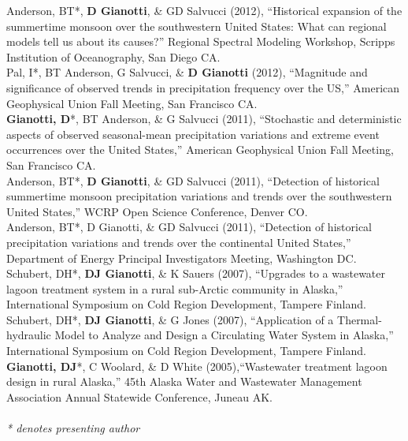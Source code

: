 \documentclass[10pt, a4paper]{article}
\newcommand{\years}[1]{\marginnote{\scriptsize #1}}
\begin{document}
\years{2012}Anderson, BT*, \textbf{D Gianotti}, \& GD Salvucci (2012), ``Historical expansion of the summertime monsoon over the southwestern United States: What can regional models tell us about its causes?'' Regional Spectral Modeling Workshop, Scripps Institution of Oceanography, San Diego CA.\\
\years{2012}Pal, I*, BT Anderson, G Salvucci, \& \textbf{D Gianotti} (2012), ``Magnitude and significance of observed trends in precipitation frequency over the US,'' American Geophysical Union Fall Meeting, San Francisco CA.\\
\years{2011}\textbf{Gianotti, D}*, BT Anderson, \& G Salvucci (2011), ``Stochastic and deterministic aspects of observed seasonal-mean precipitation variations and extreme event occurrences over the United States,'' American Geophysical Union Fall Meeting, San Francisco CA.\\
\years{2011} Anderson, BT*, \textbf{D Gianotti}, \& GD Salvucci (2011), ``Detection of historical summertime monsoon precipitation variations and trends over the southwestern United States,'' WCRP Open Science Conference, Denver CO.\\
\years{2011} Anderson, BT*, D Gianotti, \& GD Salvucci (2011), ``Detection of historical precipitation variations and trends over the continental United States,'' Department of Energy Principal Investigators Meeting, Washington DC.\\
\years{2007}Schubert, DH*, \textbf{DJ Gianotti}, \& K Sauers (2007), ``Upgrades to a  wastewater lagoon treatment system in a rural sub-Arctic community in Alaska,'' International Symposium on Cold Region Development, Tampere Finland.\\
\years{2007}Schubert, DH*, \textbf{DJ Gianotti}, \& G Jones (2007), ``Application of a Thermal-hydraulic Model to Analyze and Design a Circulating Water System in Alaska,'' International Symposium on Cold Region Development, Tampere Finland.\\
\years{2005}\textbf{Gianotti, DJ}*, C Woolard, \& D White (2005),``Wastewater treatment lagoon design in rural Alaska,'' 45th Alaska Water and Wastewater Management Association Annual Statewide Conference, Juneau AK.\\
\\ \emph{* denotes presenting author}
\end{document}
